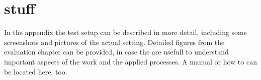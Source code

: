 \chapter{stuff}
\label{ch:app_stuff}

In the appendix the test setup can be described in more detail, including some
screenshots and pictures of the actual setting. Detailed figures from the
evaluation chapter can be provided, in case the are usefull to understand
important aspects of the work and the applied processes. A manual or how to
can be located here, too.
